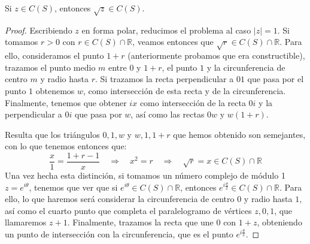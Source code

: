 \begin{lema}
    Si $z\in C(S)$, entonces $\sqrt{z}\in C(S)$.
    \begin{proof}
        Escribiendo $z$ en forma polar, reducimos el problema al caso $|z| = 1$. Si tomamos $r>0$ con $r\in C(S)\cap \mathbb{R}$, veamos entonces que $\sqrt{r}\in C(S)\cap \mathbb{R}$. Para ello, consideramos el punto $1+r$ (anteriormente probamos que era constructible), trazamos el punto medio $m$ entre $0$ y $1+r$, el punto $1$ y la circunferencia de centro $m$ y radio hasta $r$. Si trazamos la recta perpendicular a $01$ que pasa por el punto $1$ obtenemos $w$, como intersección de esta recta y de la circunferencia. Finalmente, tenemos que obtener $ix$ como intersección de la recta $0i$ y la perpendicular a $0i$ que pasa por $w$, así como las rectas $0w$ y $w(1+r)$.
        \begin{figure}[H]
            \centering
        \end{figure}
        Resulta que los triángulos $0, 1, w$ y $w, 1, 1+r$ que hemos obtenido son semejantes, con lo que tenemos entonces que:
        \begin{equation*}
            \dfrac{x}{1} = \dfrac{1+r-1}{x}\quad  \Longrightarrow \quad  x^2 = r \quad  \Longrightarrow\quad   \sqrt{r} = x \in C(S)\cap \mathbb{R}
        \end{equation*}
        Una vez hecha esta distinción, si tomamos un número complejo de módulo 1 $z=e^{i\theta}$, tenemos que ver que si $e^{i\theta}\in C(S)\cap \mathbb{R}$, entonces $e^{i\frac{\theta}{2}}\in C(S)\cap \mathbb{R}$. Para ello, lo que haremos será considerar la circunferencia de centro $0$ y radio hasta $1$, así como el cuarto punto que completa el paralelogramo de vértices $z,0,1$, que llamaremos $z+1$. Finalmente, trazamos la recta que une $0$ con $1+z$, obteniendo un punto de intersección con la circunferencia, que es el punto $e^{i\frac{\theta}{2}}$.

\end{proof}
\end{lema}
